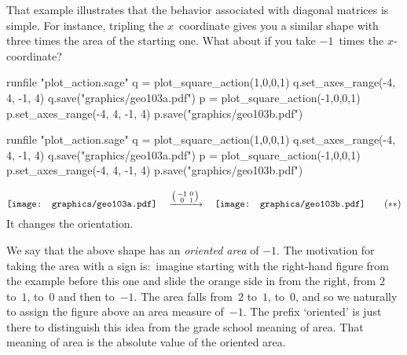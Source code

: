 That example illustrates that the behavior associated with diagonal matrices
is simple.
For instance, tripling the $x$~coordinate gives you a similar shape with
three times the area of the starting one.
What about if you take $-1$~times the $x$-coordinate?
\begin{sageoutput}[d,0,4;d,5,7]
runfile "plot_action.sage"
q = plot_square_action(1,0,0,1) 
q.set_axes_range(-4, 4, -1, 4) 
q.save("graphics/geo103a.pdf")
p = plot_square_action(-1,0,0,1) 
p.set_axes_range(-4, 4, -1, 4) 
p.save("graphics/geo103b.pdf")
\end{sageoutput}
\begin{sagesilent}
runfile "plot_action.sage"
q = plot_square_action(1,0,0,1) 
q.set_axes_range(-4, 4, -1, 4) 
q.save("graphics/geo103a.pdf")
p = plot_square_action(-1,0,0,1) 
p.set_axes_range(-4, 4, -1, 4) 
p.save("graphics/geo103b.pdf")
\end{sagesilent}
\begin{equation*}
  \vcenteredhbox{\texttt{[image: graphics/geo103a.pdf]}}
  \quad\mapsvia{\big (\begin{smallmatrix} -1 &0 \\ 0 &1 \end{smallmatrix}\big )}\quad
  \vcenteredhbox{\texttt{[image: graphics/geo103b.pdf]}}
  \tag{$**$}
\end{equation*}
\noindent
It changes the orientation.

We say that the above shape has an \textit{oriented area}
of $-1$.
The motivation for taking the area with a sign 
is:~imagine starting with the right-hand figure 
from the example before this one
and slide the orange side in from the right, from $2$ to~$1$, to~$0$ and
then to~$-1$.
The area falls from~$2$ to~$1$, to~$0$, and so we naturally
to assign the figure above an area measure of~$-1$.
The prefix `oriented' is just there to distinguish this idea from the
grade school meaning of
area.
That meaning of area is the absolute value of the oriented area.

